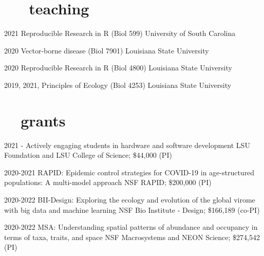 \documentclass[]{CV}
\begin{document}
\section{ \faInstitution \ \ \ teaching}

\begin{entrylist}

  \entry
    {2021}
		{Reproducible Research in R (Biol 599)}
    {University of South Carolina}

  \entry
    {2020}
		{Vector-borne disease (Biol 7901)}
    {Louisiana State University}

  \entry
    {2020}
		{Reproducible Research in R (Biol 4800)}
    {Louisiana State University}

  \entry
    {2019, 2021, }
		{Principles of Ecology (Biol 4253)}
    {Louisiana State University}

\end{entrylist}










\section{\faDollar \ \ grants}

\begin{entrylist}

 \entry
 {2021 - }
 {Actively engaging students in hardware and software development}
 {LSU Foundation and LSU College of Science; \$44,000 (PI)}

 \entry
 {2020-2021}
 {RAPID: Epidemic control strategies for COVID-19 in age-structured populations: A multi-model approach }
 {NSF RAPID; \$200,000 (PI)}

 \entry
 {2020-2022}
 {BII-Design: Exploring the ecology and evolution of the global virome with big data and machine learning}
 {NSF Bio Institute - Design; \$166,189 (co-PI)}

 \entry
 {2020-2022}
 {MSA: Understanding spatial patterns of abundance and occupancy in terms of taxa, traits, and space}
 {NSF Macrosystems and NEON Science; \$274,542 (PI)}


\end{entrylist}
\end{document}
